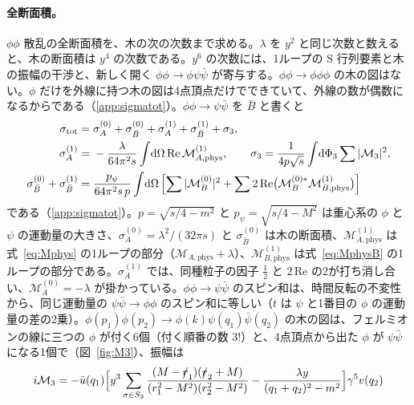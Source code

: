 \documentclass[a4paper,10pt]{ltjsarticle}
\newcommand{\dd}{\mathrm{d}}
\begin{document}
\paragraph{全断面積。}$\phi\phi$ 散乱の全断面積を、木の次の次数まで求める。$\lambda$ を $y^2$ と同じ次数と数えると、木の断面積は $y^4$ の次数である。$y^6$ の次数には、1ループの S 行列要素と木の振幅の干渉と、新しく開く $\phi\phi\to\phi\psi\bar\psi$ が寄与する。$\phi\phi\to\phi\phi\phi$ の木の図はない。$\phi$ だけを外線に持つ木の図は4点頂点だけでできていて、外線の数が偶数になるからである（\ref{app:sigmatot}）。$\phi\phi\to\psi\bar\psi$ を $\bar B$ と書くと
\begin{equation}
\begin{aligned}
\sigma_{\mathrm{tot}}={}&\sigma_A^{(0)}+\sigma_{\bar B}^{(0)}+\sigma_A^{(1)}+\sigma_{\bar B}^{(1)}+\sigma_3,\\
\sigma_A^{(1)}={}&-\frac{\lambda}{64\pi^2s}\int\!\dd\Omega\,\mathrm{Re}\,\mathcal M_{A,\mathrm{phys}}^{(1)},\qquad
\sigma_3=\frac{1}{4p\sqrt s}\int\!\dd\Phi_3\sum|\mathcal M_3|^2,\\
\sigma_{\bar B}^{(0)}+\sigma_{\bar B}^{(1)}={}&\frac{p_\psi}{64\pi^2s\,p}\int\!\dd\Omega\,\Bigl[\sum|\mathcal M_B^{(0)}|^2+\sum2\,\mathrm{Re}\bigl(\mathcal M_B^{(0)*}\mathcal M_{B,\mathrm{phys}}^{(1)}\bigr)\Bigr]
\end{aligned}
\label{eq:sigmatot}
\end{equation}
である（\ref{app:sigmatot}）。$p=\sqrt{s/4-m^2}$ と $p_\psi=\sqrt{s/4-M^2}$ は重心系の $\phi$ と $\psi$ の運動量の大きさ、$\sigma_A^{(0)}=\lambda^2/(32\pi s)$ と $\sigma_{\bar B}^{(0)}$ は木の断面積、$\mathcal M_{A,\mathrm{phys}}^{(1)}$ は式~\eqref{eq:Mphys} の1ループの部分（$\mathcal M_{A,\mathrm{phys}}+\lambda$）、$\mathcal M_{B,\mathrm{phys}}^{(1)}$ は式~\eqref{eq:MphysB} の1ループの部分である。$\sigma_A^{(1)}$ では、同種粒子の因子 $\frac12$ と $2\,\mathrm{Re}$ の2が打ち消し合い、$\mathcal M_A^{(0)}=-\lambda$ が掛かっている。$\phi\phi\to\psi\bar\psi$ のスピン和は、時間反転の不変性から、同じ運動量の $\psi\bar\psi\to\phi\phi$ のスピン和に等しい（$t$ は $\psi$ と1番目の $\phi$ の運動量の差の2乗）。$\phi(p_1)\phi(p_2)\to\phi(k)\psi(q_1)\bar\psi(q_2)$ の木の図は、フェルミオンの線に三つの $\phi$ が付く6個（付く順番の数 $3!$）と、4点頂点から出た $\phi$ が $\psi\bar\psi$ になる1個で（図~\ref{fig:M3}）、振幅は
\begin{equation}
i\mathcal M_3=-\bar u(q_1)\Bigl[y^3\sum_{\sigma\in S_3}\frac{(M-\slashed r_1)(\slashed r_2+M)}{(r_1^2-M^2)(r_2^2-M^2)}-\frac{\lambda y}{(q_1+q_2)^2-m^2}\Bigr]\gamma^5v(q_2)
\label{eq:M3}
\end{equation}
\end{document}
